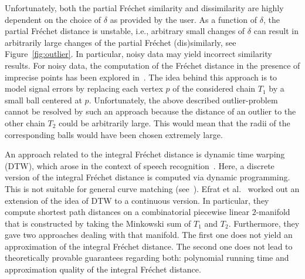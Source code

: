 \documentclass[a4paper,11pt]{article}
\begin{document}
	Unfortunately, both the partial Fr\'{e}chet similarity and dissimilarity are highly dependent on  the choice of $\delta$ as provided by the user. As a function of $\delta$, the partial Fr\'{e}chet distance is unstable, i.e., arbitrary small changes of $\delta$ can result in arbitrarily large changes of the partial Fr\'{e}chet (dis)similarly, see Figure~\ref{fig:outlier}. In particular, noisy data may yield  incorrect similarity results. For noisy data,   the computation of the Fr\'{e}chet distance in the presence of imprecise points has been explored in~\cite{ahn:imprecise}. The idea behind this approach is to model signal errors by replacing each vertex $p$ of the considered chain $T_1$ by a small ball centered at $p$. Unfortunately, the above described outlier-problem cannot be resolved by such an approach because the distance of an outlier to the other chain $T_2$ could be arbitrarily large. This would mean that the radii of the corresponding balls would have been chosen extremely large.
	


	An approach related to the integral Fr\'{e}chet distance is dynamic time warping (DTW), which arose in the context of speech recognition~\cite{rabiner:fundamentals}. Here, a discrete version of the integral Fr\'{e}chet distance is computed via dynamic programming. This is not suitable for general curve matching (see~\cite[p. 204]{efrat:mathching}). Efrat et al.~\cite{efrat:mathching} worked out an extension of the idea of DTW to a continuous version. In particular, they  compute shortest path distances on a combinatorial piecewise linear $2$-manifold that is constructed by taking the Minkowski sum of $T_1$ and $T_2$. Furthermore, they gave two approaches dealing with that manifold. The first one does not yield an approximation of the integral Fr\'{e}chet distance. The second one does not lead to theoretically provable guarantees regarding both: polynomial running time and approximation quality of the integral Fr\'{e}chet distance.  
	
\end{document}
